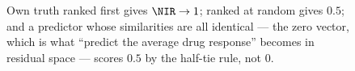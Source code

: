 \begin{figure}[htbp]
\begin{fullwidth}
\begin{tikzpicture}
\end{tikzpicture}%
\caption[NIR is a discrimination score]{ Own truth ranked first gives $\NIR \to 1$; ranked at random gives $0.5$; and a predictor whose
similarities are all identical --- the zero vector, which is what ``predict the average drug
response'' becomes in residual space --- scores $0.5$ by the half-tie rule, not $0$.}
\label{fig:nir}
\end{fullwidth}
\end{figure}

